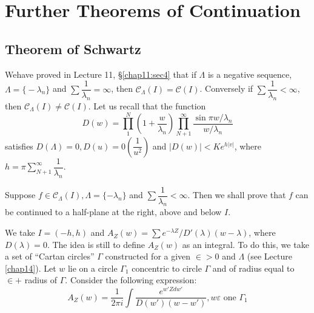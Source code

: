 \chapter{Further Theorems of Continuation}\label{chap16}

\section{Theorem of Schwartz}\label{chap16:sec1}

We\pageoriginale have proved in Lecture 11, \S \ref{chap11:sec4} that if $\Lambda$ is a negative
sequence, $\Lambda = \big \{ - \lambda_n \big\}$ and $\sum
\dfrac{1}{\lambda_n} = \infty$, then $\mathscr{C}_\Lambda (I) =
\mathscr{C} (I)$. Conversely if $\sum \dfrac{1}{\lambda_n} < \infty$,
then $\mathscr{C}_\Lambda (I) \neq \mathscr{C}(I)$. Let us recall that
the function 
$$
D(w) = \prod_{1}^N \left(1 + \frac{w}{\lambda_n}\right) \prod^\infty_{N + 1}
\frac{\sin \pi w/ \lambda_n}{w/\lambda_n} 
$$
satisfies $D(\Lambda) = 0, D(u) = 0(\dfrac{1}{u^2})$ and $\big |D (w)
\big | < K e^{h|v|}$, where $h = \pi \sum\limits^{\infty}_{N+1}
\dfrac{1}{\lambda_n}$. 

Suppose $f \in \mathscr{C}_\Lambda (I), \Lambda = \{- \lambda_n \}$
and $\sum \dfrac{1}{\lambda_n} < \infty$. Then we shall prove that $f$
can be continued to a half-plane at the right, above and below $I$. 

We take $I = (- h, h)$ and $A_Z(w) = \sum e^{- \lambda Z} / D'
(\lambda) (w - \lambda)$, where $D(\lambda) = 0$. The idea is still to
define $A_Z(w)$ as an integral. To do this, we take a set of ``Cartan
circles'' $\Gamma$ constructed for a given $\in > 0$ and
$\Lambda$ (see Lecture \ref{chap14}). Let $w$ lie on a circle $\Gamma_1$
concentric to circle $\Gamma$ and of radius equal to $\in + $
radius of $\Gamma$. Consider the following expression: 
$$
A_Z (w) = \frac{1}{2 \pi i} \int \frac{e^{w' Z d w'}}{D(w') (w-w')},
w \varepsilon \text { one } \Gamma_1 
$$

